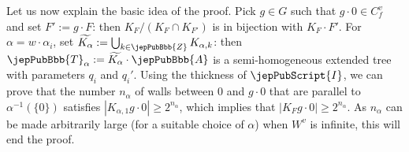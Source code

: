 Let us now explain the basic idea of the proof. Pick $g\in G$ such that $g\cdot0\in C_f^v$ and set $F':=g\cdot F$: then $K_F/(K_F\cap K_{F'})$ is in bijection with $K_F\cdot F'$. For $\alpha=w\cdot\alpha_i$, set $\widetilde{K_\alpha}:=\bigcup_{k\in\jepPubBbb{Z}}K_{\alpha,k}$: then $\jepPubBbb{T}_\alpha:=\widetilde{K_\alpha}\cdot\jepPubBbb{A}$ is a semi-homogeneous extended tree with parameters $q_i$ and $q_i'$. Using the thickness of $\jepPubScript{I}$, we can prove that the number $n_\alpha$ of walls between $0$ and $g\cdot0$ that are parallel to $\alpha^{-1}(\{0\})$ satisfies $|K_{\alpha,1}g\cdot0|\geqslant2^{n_\alpha}$, which implies that $|K_Fg\cdot0|\geqslant2^{n_\alpha}$. As $n_\alpha$ can be made arbitrarily large (for a suitable choice of $\alpha$) when $W^v$ is infinite, this will end the proof.
